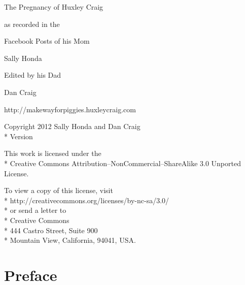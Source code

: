 \documentclass[11pt,ebook]{memoir}
\begin{document}
\frontmatter

\thispagestyle{empty}
\vspace*{1in}
\begin{center}
\end{center}

\cleardoublepage
\thispagestyle{empty}
\vspace*{\fill}
\begin{center}
\par
\vspace{1in}
\LARGE{The Pregnancy of Huxley Craig}\par
\vspace{0.25in}
\large{as recorded in the}\par
\large{Facebook Posts of his Mom}\par
\LARGE{Sally Honda}\par
\vspace{1in}
\large{Edited by his Dad}\par
\LARGE{Dan Craig}\par
\vspace{0.2in}
\large{http://makewayforpiggies.huxleycraig.com}
\end{center}
\vspace*{\fill}
\clearpage

\begingroup
\vspace*{\fill}
\footnotesize
\setlength{\parindent}{0pt}
\setlength{\parskip}{\baselineskip}
\textcopyright{} Copyright 2012 Sally Honda and Dan Craig\\*
Version %

This work is licensed under the\\*
Creative Commons Attribution--NonCommercial--ShareAlike 3.0 Unported License.

To view a copy of this license, visit \\*
http://creativecommons.org/licenses/by-nc-sa/3.0/\\*
or send a letter to \\*
Creative Commons\\*
444 Castro Street, Suite 900\\*
Mountain View, California, 94041, USA.
\vspace*{\fill}
\endgroup
\clearpage

\tableofcontents
\thispagestyle{empty}
\cleardoublepage

\chapter{Preface}
\end{document}
